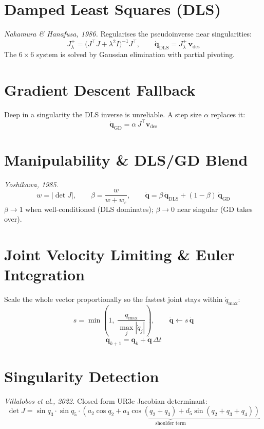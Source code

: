 \documentclass[11pt,a4paper]{article}
\begin{document}
\section{Damped Least Squares (DLS)}

\textit{Nakamura \& Hanafusa, 1986.} Regularises the pseudoinverse near singularities:
\[
J^+_{\lambda} = \bigl(J^\top J + \lambda^2 I\bigr)^{-1} J^\top, \qquad
\dot{\mathbf{q}}_{\text{DLS}} = J^+_\lambda\,\mathbf{v}_{\text{des}}
\]
The $6\times6$ system is solved by Gaussian elimination with partial pivoting.

\section{Gradient Descent Fallback}

Deep in a singularity the DLS inverse is unreliable. A step size $\alpha$ replaces it:
\[
\dot{\mathbf{q}}_{\text{GD}} = \alpha\,J^\top \mathbf{v}_{\text{des}}
\]

\section{Manipulability \& DLS/GD Blend}

\textit{Yoshikawa, 1985.}
\[
w = |\det J|, \qquad
\beta = \frac{w}{w + w_\varepsilon}, \qquad
\dot{\mathbf{q}} = \beta\,\dot{\mathbf{q}}_{\text{DLS}} + (1-\beta)\,\dot{\mathbf{q}}_{\text{GD}}
\]
$\beta \to 1$ when well-conditioned (DLS dominates); $\beta \to 0$ near singular (GD takes over).

\section{Joint Velocity Limiting \& Euler Integration}

Scale the whole vector proportionally so the fastest joint stays within $\dot{q}_{\max}$:
\[
s = \min\!\left(1,\;\frac{\dot{q}_{\max}}{\max_j |\dot{q}_j|}\right), \qquad
\dot{\mathbf{q}} \leftarrow s\,\dot{\mathbf{q}}
\]
\[
\mathbf{q}_{k+1} = \mathbf{q}_k + \dot{\mathbf{q}}\,\Delta t
\]

\section{Singularity Detection}

\textit{Villalobos et al., 2022.} Closed-form UR3e Jacobian determinant:
\[
\det J = \sin q_3 \cdot \sin q_5 \cdot
\underbrace{(a_2 \cos q_2 + a_3 \cos(q_2{+}q_3) + d_5 \sin(q_2{+}q_3{+}q_4))}_{\text{shoulder term}}
\]
\end{document}
